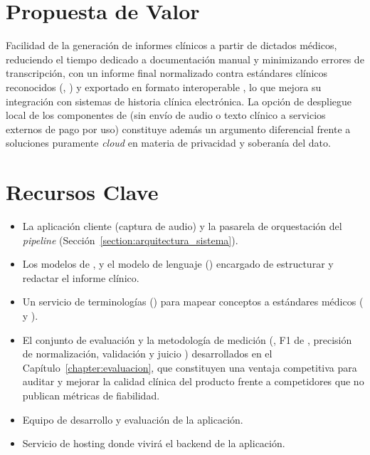 \section{Propuesta de Valor}\label{section:innovacion_propuesta_valor}

Facilidad de la generación de informes clínicos a partir de dictados médicos, reduciendo el tiempo
dedicado a documentación manual y minimizando errores de transcripción, con un informe final
normalizado contra estándares clínicos reconocidos (, )
y exportado en formato interoperable , lo que mejora su integración con
sistemas de historia clínica electrónica. La opción de despliegue local de los componentes de
 (sin envío de audio o texto clínico a servicios externos de pago por uso) constituye
además un argumento diferencial frente a soluciones puramente \textit{cloud} en materia de privacidad
y soberanía del dato.

\section{Recursos Clave}\label{section:innovacion_recursos}

\begin{itemize}
    \item La aplicación cliente (captura de audio) y la pasarela de orquestación del \textit{pipeline}
    (Sección~\ref{section:arquitectura_sistema}).
    \item Los modelos de ,  y el modelo de lenguaje ()
    encargado de estructurar y redactar el informe clínico.
    \item Un servicio de terminologías () para mapear conceptos a estándares
    médicos ( y ).
    \item El conjunto de evaluación y la metodología de medición (, F1 de
    , precisión de normalización, validación  y juicio
    ) desarrollados en el Capítulo~\ref{chapter:evaluacion}, que constituyen
    una ventaja competitiva para auditar y mejorar la calidad clínica del producto frente a
    competidores que no publican métricas de fiabilidad.
    \item Equipo de desarrollo y evaluación de la aplicación.
    \item Servicio de hosting donde vivirá el backend de la aplicación.
\end{itemize}

